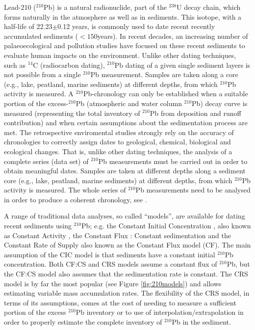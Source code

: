 \documentclass [10pt] {article}
\begin{document}
	Lead-210 ($^{210}$Pb) is a natural radionuclide, part of the $^{238}$U decay chain, which forms naturally in the atmosphere as well as in sediments.
This isotope, with a half-life of 22.23$\pm$0.12 years, is commonly used to date recent recently accumulated sediments ($<150$years). 
In recent decades, an increasing number of palaeoecological and pollution studies have focused on these recent sediments \citep[e.g.,][]{Courtney2019} to evaluate human impacts on the environment.
Unlike other dating techniques, such as $^{14}$C (radiocarbon dating), $^{210}$Pb dating of a given single sediment layers is not possible from a single $^{210}$Pb measurement.
Samples are taken along a core (e.g., lake, peatland, marine sediments) at different depths, from which $^{210}$Pb activity is measured.
A $^{210}$Pb-chronology can only be established when a suitable portion of the excess-$^{210}$Pb (atmospheric and water column $^{210}$Pb) decay curve is measured (representing the total inventory of $^{210}$Pb from deposition and runoff contribution) and when certain assumptions about the sedimentation process are met.  
The retrospective enviromental studies strongly rely on the accuracy of chronologies to correctly assign dates to geological, chemical, biological and ecological changes.
That is, unlike other dating techniques, the analysis of a complete series (data set) of $^{210}$Pb measurements must be carried out in order to obtain meaningful dates.  
Samples are taken at different depths along a sediment core (e.g., lake, peatland, marine sediments) at different depths, from which $^{210}$Pb activity is measured.  
The whole series of $^{210}$Pb measurements need to be analysed in order to produce a coherent chronology, see \citet{Aquino2018}.


	A range of traditional data analyses, so called ``models'', are available for dating recent sediments using $^{210}$Pb; e.g. the Constant Initial Concentration \citep[CIC,][]{Goldberg1963}, also known as Constant Activity \citep[CA,][]{Robbins1975}, the Constant Flux : Constant sedimentation \citep[CF:CS,][]{Crozaz1964} and the Constant Rate of Supply  \citep[CRS,][]{Appleby1978,Robbins1978,Sanchez-Cabeza2012} also known as the Constant Flux model (CF). 
The main assumption of the CIC model is that sediments have a constant initial $^{210}$Pb concentration. 
Both CF:CS and CRS models assume a constant flux of $^{210}$Pb, but the CF:CS model also assumes that the sedimentation rate is constant. 
The CRS model is by far the most popular (see Figure \ref{fig:210models}) and allows estimating variable mass accumulation rates.
The flexibility of the CRS model, in terms of its assumptions, comes at the cost of needing to measure a sufficient portion of the excess $^{210}$Pb inventory or to use of interpolation/extrapolation in order to properly estimate the complete inventory of $^{210}$Pb in the sediment. 
\end{document}
